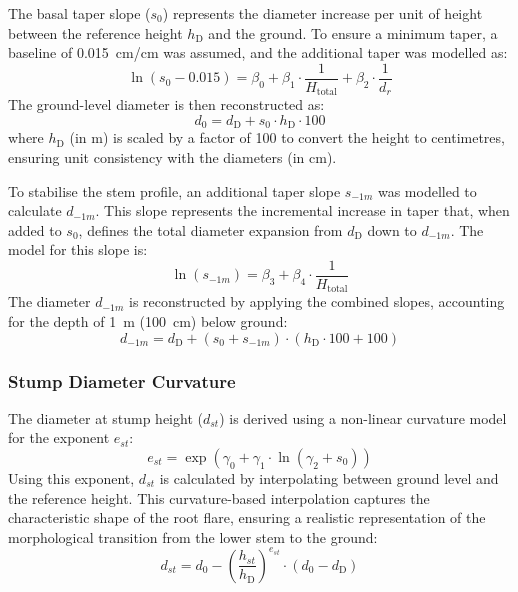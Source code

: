 \documentclass[twocolumn, bibliography=totoc]{scrartcl}
\begin{document}
The basal taper slope ($s_0$) represents the diameter increase per unit of height between the reference height $h_{\text{D}}$ and the ground. To ensure a minimum taper, a baseline of \qty{0.015}{cm/cm} was assumed, and the additional taper was modelled as:
\begin{equation}
\ln(s_0 - 0.015) = \beta_0 + \beta_1 \cdot \frac{1}{H_{\text{total}}} + \beta_2 \cdot \frac{1}{d_r}
\end{equation}
The ground-level diameter is then reconstructed as:
\begin{equation}
d_0 = d_{\text{D}} + s_0 \cdot h_{\text{D}} \cdot 100
\end{equation}
where $h_{\text{D}}$ (in \unit{m}) is scaled by a factor of 100 to convert the height to centimetres, ensuring unit consistency with the diameters (in \unit{cm}).

To stabilise the stem profile, an additional taper slope $s_{-1m}$ was modelled to calculate $d_{-1m}$. This slope represents the incremental increase in taper that, when added to $s_0$, defines the total diameter expansion from $d_{\text{D}}$ down to $d_{-1m}$. The model for this slope is:
\begin{equation}
\ln(s_{-1m}) = \beta_3 + \beta_4 \cdot \frac{1}{H_{\text{total}}}
\end{equation}
The diameter $d_{-1m}$ is reconstructed by applying the combined slopes, accounting for the depth of \qty{1}{m} (\qty{100}{cm}) below ground:
\begin{equation}
d_{-1m} = d_{\text{D}} + (s_0 + s_{-1m}) \cdot (h_{\text{D}} \cdot 100 + 100)
\end{equation}

\subsubsection{Stump Diameter Curvature}

The diameter at stump height ($d_{st}$) is derived using a non-linear curvature model for the exponent $e_{st}$:
\begin{equation}
\label{eq:est_model}
e_{st} = \exp\left(\gamma_0 + \gamma_1 \cdot \ln(\gamma_2 + s_0)\right)
\end{equation}
Using this exponent, $d_{st}$ is calculated by interpolating between ground level and the reference height. This curvature-based interpolation captures the characteristic shape of the root flare, ensuring a realistic representation of the morphological transition from the lower stem to the ground:
\begin{equation}
d_{st} = d_0 - \left( \frac{h_{st}}{h_{\text{D}}} \right)^{e_{st}} \cdot (d_0 - d_{\text{D}})
\end{equation}
\end{document}
